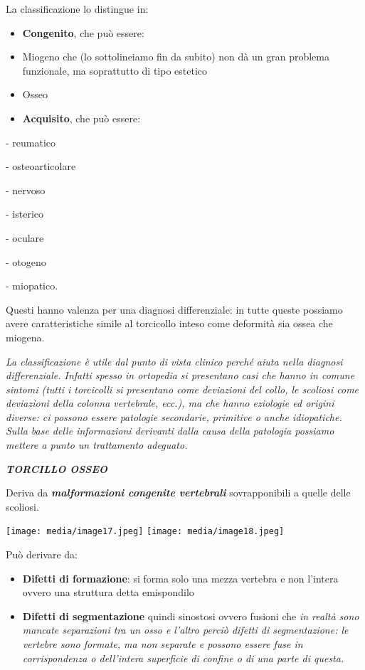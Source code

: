 \documentclass[]{article}
\begin{document}
La classificazione lo distingue in:

\begin{itemize}
\item
  \textbf{Congenito}, che può essere:
\end{itemize}

\begin{itemize}
\item
  Miogeno che (lo sottolineiamo fin da subito) non dà un gran problema
  funzionale, ma soprattutto di tipo estetico
\item
  Osseo
\end{itemize}

\begin{itemize}
\item
  \textbf{Acquisito}, che può essere:
\end{itemize}

- reumatico

- osteoarticolare

- nervoso

- isterico

- oculare

- otogeno

- miopatico.

Questi hanno valenza per una diagnosi differenziale: in tutte queste
possiamo avere caratteristiche simile al torcicollo inteso come
deformità sia ossea che miogena.

\emph{La classificazione è utile dal punto di vista clinico perché aiuta
nella diagnosi differenziale. Infatti spesso in ortopedia si presentano
casi che hanno in comune sintomi (tutti i torcicolli si presentano come
deviazioni del collo, le scoliosi come deviazioni della colonna
vertebrale, ecc.), ma che hanno eziologie ed origini diverse: ci possono
essere patologie secondarie, primitive o anche idiopatiche. Sulla base
delle informazioni derivanti dalla causa della patologia possiamo
mettere a punto un trattamento adeguato.}

\emph{\textbf{TORCILLO OSSEO}}

Deriva da \textbf{\emph{malformazioni congenite vertebrali}}
sovrapponibili a quelle delle scoliosi.

\texttt{[image: media/image17.jpeg]}
\texttt{[image: media/image18.jpeg]}

Può derivare da:

\begin{itemize}
\item
  \textbf{Difetti di formazione}: si forma solo una mezza vertebra e non
  l'intera ovvero una struttura detta emispondilo
\item
  \textbf{Difetti di segmentazione} quindi sinostosi ovvero fusioni che
  \emph{in realtà sono mancate separazioni tra un osso e l'altro perciò
  difetti di segmentazione: le vertebre sono formate, ma non separate e
  possono essere fuse in corrispondenza o dell'intera superficie di
  confine o di una parte di questa. }
\end{itemize}
\end{document}
